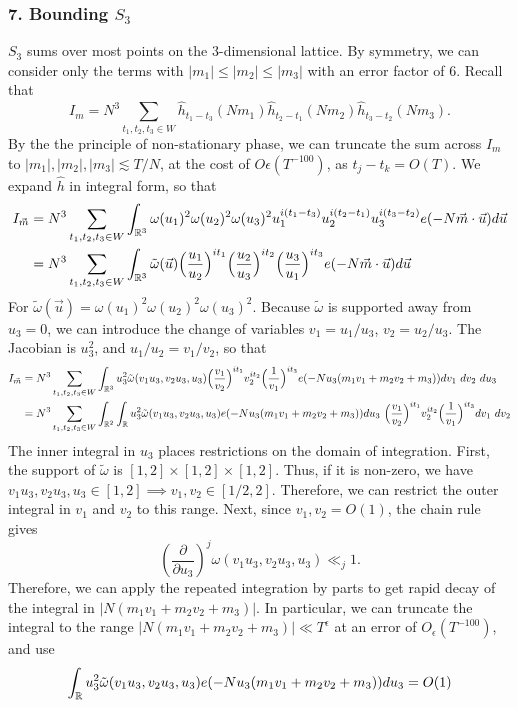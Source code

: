 \subsubsection*{7. Bounding $S_3$}
$S_3$ sums over most points on the $3$-dimensional lattice. By symmetry, we can consider only the terms with $|m_1|\leq |m_2|\leq |m_3|$ with an error factor of $6$.
Recall that \[
I_m=N^3\sum_{t_1,t_2,t_3\in W}\hat{h}_{t_1-t_3}(Nm_1)\hat{h}_{t_2-t_1}(Nm_2)\hat{h}_{t_3-t_2}(Nm_3).
\]
By the the principle of non-stationary phase, we can truncate the sum across $I_m$ to $|m_1|,|m_2|,|m_3|\lesssim T/N$, at the cost of $O\epsilon(T^{-100})$, as $t_j-t_k=O(T)$.
We expand $\hat{h}$ in integral form, so that \begin{align*}
    I_{\vec{m}}&=N^3\sum_{t_1,t_2,t_3\in W}\int_{\mathbb{R}^3} \omega(u_1)^2\omega(u_2)^2\omega(u_3)^2 u_1^{i(t_1-t_3)}u_2^{i(t_2-t_1)}u_3^{i(t_3-t_2)} e(-N\vec{m}\cdot \vec{u}) d\vec{u}\\ &=N^3\sum_{t_1,t_2,t_3\in W}\int_{\mathbb{R}^3} \tilde{\omega}(\vec{u}) \Big(\frac{u_1}{u_2}\Big)^{it_1}\Big(\frac{u_2}{u_3}\Big)^{it_2}\Big(\frac{u_3}{u_1}\Big)^{it_3}e(-N\vec{m}\cdot \vec{u}) d\vec{u}
\end{align*}
For $\tilde{\omega}(\vec{u})=\omega(u_1)^2\omega(u_2)^2\omega(u_3)^2$. Because $\tilde{\omega}$ is supported away from $u_3=0$, we can introduce the change of variables $v_1=u_1/u_3$, $v_2=u_2/u_3$. The Jacobian is $u_3^2$, and $u_1/u_2=v_1/v_2$, so that \begin{align*}
    I_{\vec{m}}& = N^3\sum_{t_1,t_2,t_3\in W}\int_{\mathbb{R}^3} u_3^2 \tilde{\omega}(v_1u_3,v_2u_3,u_3) \Big(\frac{v_1}{v_2}\Big)^{it_1} v_2^{it_2}\Big(\frac{1}{v_1}\Big)^{it_3}e(-Nu_3(m_1v_1+m_2v_2+m_3)) dv_1\ dv_2 \ du_3\\ 
    & = N^3\sum_{t_1,t_2,t_3\in W}\int_{\mathbb{R}^2}\int_{\mathbb{R}} u_3^2 \tilde{\omega}(v_1u_3,v_2u_3,u_3)e(-Nu_3(m_1v_1+m_2v_2+m_3))   du_3 \  \Big(\frac{v_1}{v_2}\Big)^{it_1} v_2^{it_2}\Big(\frac{1}{v_1}\Big)^{it_3}  dv_1\ dv_2 
\end{align*}
The inner integral in $u_3$ places restrictions on the domain of integration. First, the support of $\tilde{\omega}$ is $[1,2]\times [1,2]\times [1,2]$. Thus, if it is non-zero, we have $v_1u_3,v_2u_3,u_3\in [1,2]\implies v_1,v_2\in [1/2,2]$. Therefore, we can restrict the outer integral in $v_1$ and $v_2$ to this range. Next, since $v_1,v_2=O(1)$, the chain rule gives\[
\left(\frac{\partial}{\partial u_3}\right)^j{\omega}(v_1u_3,v_2u_3,u_3)\ll_j 1.\]
Therefore, we can apply the repeated integration by parts to get rapid decay of the integral in $|N(m_1v_1+m_2v_2+m_3)|$. In particular, we can truncate the integral to the range $|N(m_1v_1+m_2v_2+m_3)|\ll T^\epsilon$ at an error of $O_{\epsilon}(T^{-100})$, and use \[
    \int_{\mathbb{R}} u_3^2 \tilde{\omega}(v_1u_3,v_2u_3,u_3)e(-Nu_3(m_1v_1+m_2v_2+m_3))   du_3=O(1)
\]
